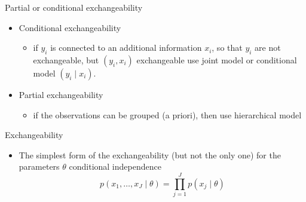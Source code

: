 \documentclass[finnish,english,t]{beamer}
\begin{document}
\begin{frame}
  
  {\Large\color{navyblue} Partial or conditional exchangeability}

\begin{itemize}
  \item Conditional exchangeability
    \begin{itemize}
    \item if $y_i$ is connected to an additional information $x_i$, so
      that $y_i$ are not exchangeable, but $(y_i,x_i)$ exchangeable
      use joint model or conditional model $(y_i \mid x_i)$.
    \end{itemize}
  \item<2-> Partial exchangeability
    \begin{itemize}
    \item if the observations can be grouped (a priori), then use
      hierarchical model
    \end{itemize}
\end{itemize}
\end{frame}

\begin{frame}{Exchangeability}

  \begin{itemize}
  \item The simplest form of the exchangeability (but not the only
    one) for the parameters $\theta$ conditional independence
    \begin{equation*}
      p(x_1,\ldots,x_J \mid \theta)=\prod_{j=1}^J p(x_j \mid \theta)
    \end{equation*}

   \end{itemize}
\end{frame}
\end{document}
